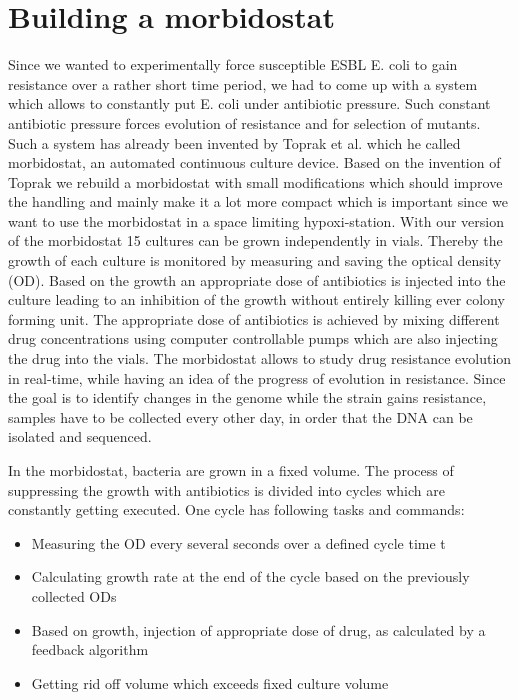 \section{Building a morbidostat} 
Since we wanted to experimentally force susceptible ESBL E. coli to gain resistance over a rather short time period, we had to come up with a system which allows to constantly put E. coli under antibiotic pressure. Such constant antibiotic pressure forces evolution of resistance and for selection of mutants. Such a system has already been invented by Toprak et al. \cite{morb_toprak} which he called morbidostat, an automated continuous culture device. Based on the invention of Toprak we rebuild a morbidostat with small modifications which should improve the handling and mainly make it a lot more compact which is important since we want to use the morbidostat in a space limiting hypoxi-station. With our version of the morbidostat 15 cultures can be grown independently in vials. Thereby the growth of each culture is monitored by measuring and saving the optical density (OD). Based on the growth an appropriate dose of antibiotics is injected into the culture leading to an inhibition of the growth without entirely killing ever colony forming unit. The appropriate dose of antibiotics is achieved by mixing different drug concentrations using computer controllable pumps which are also injecting the drug into the vials.
The morbidostat allows to study drug resistance evolution in real-time, while having an idea of the progress of evolution in resistance. Since the goal is to identify changes in the genome while the strain gains resistance, samples have to be collected every other day, in order that the DNA can be isolated and sequenced.

In the morbidostat, bacteria are grown in a fixed volume. The process of suppressing the growth with antibiotics is divided into cycles which are constantly getting executed. One cycle has following tasks and commands:
\begin{itemize}
	\item Measuring the OD every several seconds over a defined cycle time \textDelta t 
	\item Calculating growth rate at the end of the cycle based on the previously collected ODs
	\item Based on growth, injection of appropriate dose of drug, as calculated by a feedback algorithm
	\item Getting rid off volume which exceeds fixed culture volume
\end{itemize}

